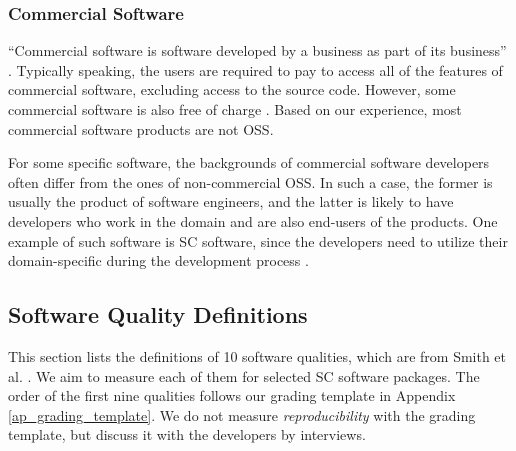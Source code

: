 \documentclass[preprint,12pt,authoryear]{elsarticle}
\begin{document}
\subsubsection{Commercial Software}

``Commercial software is software developed by a business as part of its
business'' \citep{GNU2019}. Typically speaking, the users are required to pay to
access all of the features of commercial software, excluding access to the
source code. However, some commercial software is also free of charge
\citep{GNU2019}. Based on our experience, most commercial software products are
not OSS.

For some specific software, the backgrounds of commercial software developers
often differ from the ones of non-commercial OSS. In such a case, the former is
usually the product of software engineers, and the latter is likely to have
developers who work in the domain and are also end-users of the products. One
example of such software is SC software, since the developers need to utilize
their domain-specific during the development process \citep{Wilson2014}.

\subsection{Software Quality Definitions} \label{sec_software_quality}

This section lists the definitions of 10 software qualities, which are from
Smith et al. \citep{SmithEtAl2020}. We aim to measure each of them for selected
SC software packages. The order of the first nine qualities follows our grading
template in Appendix \ref{ap_grading_template}. We do not measure
\textit{reproducibility} with the grading template, but discuss it with the
developers by interviews.
\end{document}
